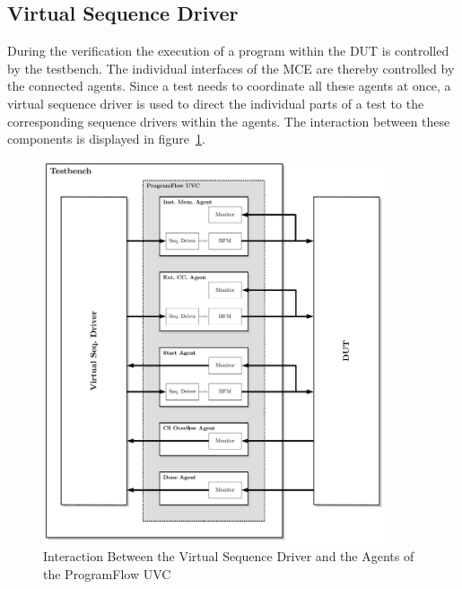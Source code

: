 \subsection{Virtual Sequence Driver}

During the verification the execution of a program within the DUT is controlled by the testbench.
The individual interfaces of the MCE are thereby controlled by the connected agents.
Since a test needs to coordinate all these agents at once, a virtual sequence driver is used to direct the individual parts of a test to the corresponding
sequence drivers within the agents. The interaction between these components is displayed in figure~\ref{fig:vsd}.

\begin{figure}[htb]
 \centering
 \includegraphics[width=0.9\textwidth,angle=0]{images/vsd}
 \caption{Interaction Between the Virtual Sequence Driver and the Agents of the ProgramFlow UVC}
\label{fig:vsd}
\end{figure}

